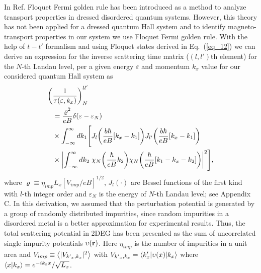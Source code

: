 
In Ref. \cite{wackerl20} Floquet Fermi golden rule has been introduced as a method to analyze transport properties in dressed disordered quantum systems. However, this theory has not been applied for a dressed quantum Hall system and to identify magneto-transport properties in our system we use Floquet Fermi golden rule.
With the help of $t-t'$ formalism \cite{wackerl20,grifoni98,sambe75,peskin93,althorpe97} and using Floquet states derived in Eq.~(\ref{eq_12}) we can derive an  expression for the inverse scattering time matrix ($(l,l')$th element) for the $N$-th Landau level, per a given energy $\varepsilon$ and momentum $k_x$ value for our considered quantum Hall system as
\begin{equation} \label{eq_13}
  \begin{aligned}
    \bigg(&\frac{1}{\tau(\varepsilon,k_x)}\bigg)^{ll'}_{N} \\
    & =
    \frac { \varrho^2}{eB}
    \delta(\varepsilon - \varepsilon_{N}) \\
    & \times
    \int_{-\infty}^{\infty} d k_1 \Bigg[
    J_l\qty(\frac{b\hbar}{eB}[{k}_x - k_1])
    J_{l'}\qty(\frac{b\hbar}{eB}[{k}_x - k_1]) \\
    & \times
    \qty|
    \int_{-\infty}^{\infty} dk_2 \;
    {\chi}_{N}\qty(\frac{\hbar}{eB}k_2)
    {\chi}_{N}\qty(\frac{\hbar}{eB} \qty[k_1 - {k}_x - k_2])|^2\Bigg],
  \end{aligned}
\end{equation}
where $\varrho \equiv \eta_{imp} L_x [ { V_{imp}}/{eB}]^{1/2}$,
$J_l(\cdot)$ are Bessel functions of the first kind with $l$-th integer order and $\varepsilon_N$ is the energy of $N$-th Landau level; see Appendix C. In this derivation, we assumed that the perturbation potential is generated by a group of randomly distributed impurities, since random impurities in a disordered metal is a better approximation for experimental results. Thus, the total scattering potential in 2DEG has been presented as the sum of uncorrelated single impurity potentials $\upsilon(\vb{r})$. Here $\eta_{imp}$ is the number of impurities in a unit area and $V_{imp} \equiv \expval{|V_{{k'}_x,k_x}|^2}$ with $V_{{k'}_x,k_x} = \mel**{k'_x}{\upsilon(x) }{k_x}$ where $\braket{x}{k_x} = e^{-ik_x x}/\sqrt{L_x}$.

